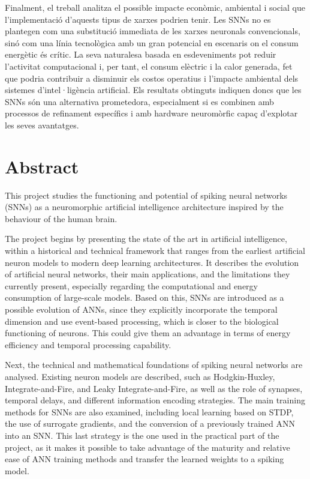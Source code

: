 \documentclass[a4paper,11pt, titlepage, twoside]{article}
\begin{document}
Finalment, el treball analitza el possible impacte econòmic, ambiental i social que l'implementació d'aquests tipus de xarxes podrien tenir. Les SNNs no es plantegen com una substitució immediata de les xarxes neuronals convencionals, sinó com una línia tecnològica amb un gran potencial en escenaris on el consum energètic és crític. La seva naturalesa basada en esdeveniments pot reduir l’activitat computacional i, per tant, el consum elèctric i la calor generada, fet que podria contribuir a disminuir els costos operatius i l’impacte ambiental dels sistemes d’intel·ligència artificial. Els resultats obtinguts indiquen doncs que les SNNs són una alternativa prometedora, especialment si es combinen amb processos de refinament específics i amb hardware neuromòrfic capaç d’explotar les seves avantatges.

\section*{Abstract}
This project studies the functioning and potential of spiking neural networks (SNNs) as a neuromorphic artificial intelligence architecture inspired by the behaviour of the human brain.

The project begins by presenting the state of the art in artificial intelligence, within a historical and technical framework that ranges from the earliest artificial neuron models to modern deep learning architectures. It describes the evolution of artificial neural networks, their main applications, and the limitations they currently present, especially regarding the computational and energy consumption of large-scale models. Based on this, SNNs are introduced as a possible evolution of ANNs, since they explicitly incorporate the temporal dimension and use event-based processing, which is closer to the biological functioning of neurons. This could give them an advantage in terms of energy efficiency and temporal processing capability.

Next, the technical and mathematical foundations of spiking neural networks are analysed. Existing neuron models are described, such as Hodgkin-Huxley, Integrate-and-Fire, and Leaky Integrate-and-Fire, as well as the role of synapses, temporal delays, and different information encoding strategies. The main training methods for SNNs are also examined, including local learning based on STDP, the use of surrogate gradients, and the conversion of a previously trained ANN into an SNN. This last strategy is the one used in the practical part of the project, as it makes it possible to take advantage of the maturity and relative ease of ANN training methods and transfer the learned weights to a spiking model.
\end{document}
